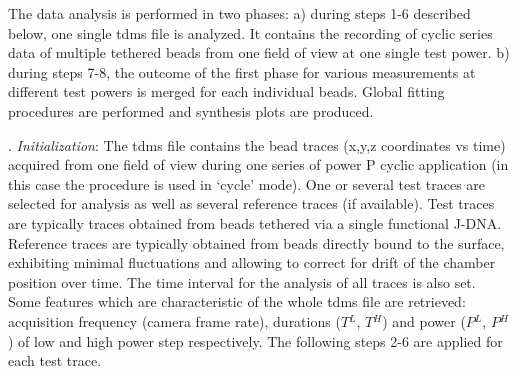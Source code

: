 \documentclass{biophys-new}
\begin{document}

The data analysis is performed in two phases: a) during steps 1-6 described below, one single tdms file is analyzed. It contains the recording of cyclic series data of multiple tethered beads from one field of view at one single test power. b) during steps 7-8, the outcome of the first phase for various measurements at different test powers is merged for each individual beads. Global fitting procedures are performed and synthesis plots are produced.

. \textit{ Initialization}: %
The tdms file contains the bead traces (x,y,z coordinates vs time) acquired from one field of view during one series of power P cyclic application (in this case the procedure is used in ‘cycle’ mode). One or several test traces are selected for analysis as well as several reference traces (if available). Test traces are typically traces obtained from beads tethered via a single functional J-DNA. Reference traces are typically obtained from beads directly bound to the surface, exhibiting minimal fluctuations and allowing to correct for drift of the chamber position over time. The time interval for the analysis of all traces is also set. Some features which are characteristic of the whole tdms file are retrieved: acquisition frequency (camera frame rate), durations ($T{^L}$, $T{^H}$) and power ($P{^L}$, $P{^H}$) of low and high power step respectively. The following steps 2-6 are applied for each test trace.\\
\end{document}
